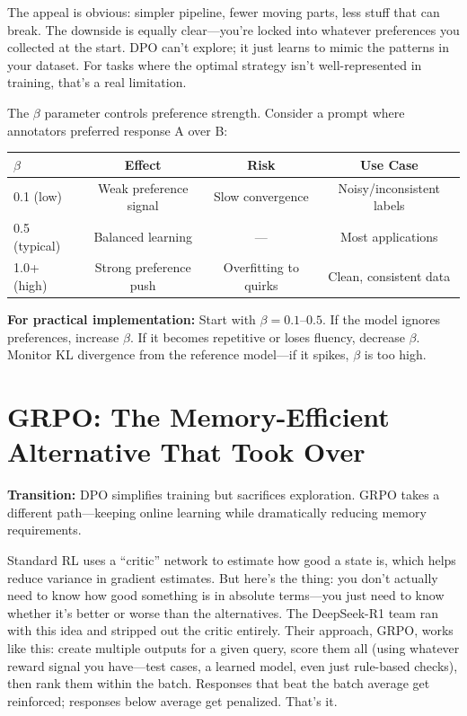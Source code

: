 \documentclass[12pt,a4paper]{report}
\theoremstyle{definition}
\begin{document}
The appeal is obvious: simpler pipeline, fewer moving parts, less stuff that can break. The downside is equally clear---you're locked into whatever preferences you collected at the start. DPO can't explore; it just learns to mimic the patterns in your dataset. For tasks where the optimal strategy isn't well-represented in training, that's a real limitation.

\begin{tcolorbox}[colback=gray!5!white, colframe=gray!60!black, title=\textbf{Worked Example: DPO $\beta$ Parameter Tuning}]
\small
The $\beta$ parameter controls preference strength. Consider a prompt where annotators preferred response A over B:

\begin{center}
\begin{tabular}{lccc}
\toprule
$\beta$ & \textbf{Effect} & \textbf{Risk} & \textbf{Use Case} \\
\midrule
0.1 (low) & Weak preference signal & Slow convergence & Noisy/inconsistent labels \\
0.5 (typical) & Balanced learning & --- & Most applications \\
1.0+ (high) & Strong preference push & Overfitting to quirks & Clean, consistent data \\
\bottomrule
\end{tabular}
\end{center}

\textbf{For practical implementation:} Start with $\beta = 0.1$--$0.5$.
 If the model ignores preferences, increase $\beta$. If it becomes repetitive or loses fluency, decrease $\beta$. Monitor KL divergence from the reference model---if it spikes, $\beta$ is too high.
\end{tcolorbox}

\section{GRPO: The Memory-Efficient Alternative That Took Over}
\label{sec:grpo}
\textbf{Transition:} DPO simplifies training but sacrifices exploration. GRPO takes a different path---keeping online learning while dramatically reducing memory requirements.

Standard RL uses a ``critic'' network to estimate how good a state is, which helps reduce variance in gradient estimates. But here's the thing: you don't actually need to know how good something is in absolute terms---you just need to know whether it's better or worse than the alternatives. The DeepSeek-R1 team \cite{deepseek2025r1} ran with this idea and stripped out the critic entirely. Their approach, GRPO, works like this: create multiple outputs for a given query, score them all
 (using whatever reward signal you have---test cases, a learned model, even just rule-based checks), then rank them within the batch. Responses that beat the batch average get reinforced; responses below average get penalized. That's it.
\end{document}
